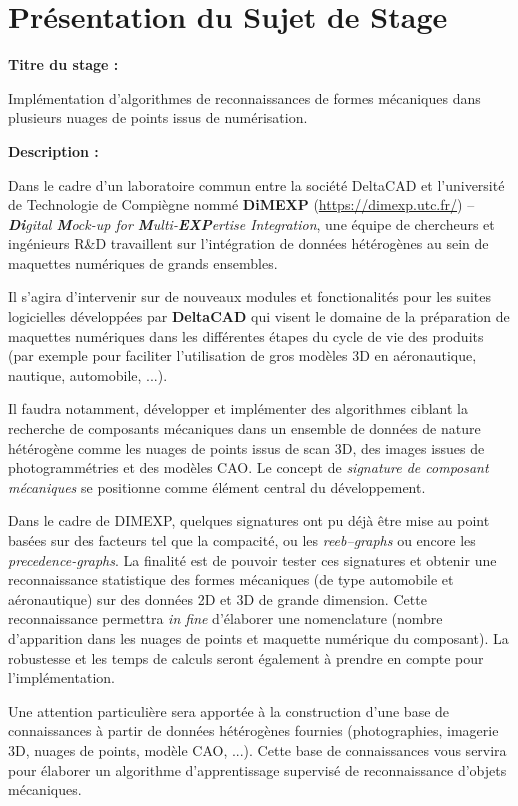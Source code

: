 \chapter{Présentation du Sujet de Stage}

	\textbf{Titre du stage :}
	
	Implémentation d’algorithmes de reconnaissances de formes mécaniques dans plusieurs nuages de points issus de numérisation.
	
	\textbf{Description :}
	
Dans le cadre d’un laboratoire commun entre la société DeltaCAD et l’université de Technologie de Compiègne nommé \textbf{DiMEXP} (\url{https://dimexp.utc.fr/}) – \textit{\textbf{Di}gital \textbf{M}ock-up for \textbf{M}ulti-\textbf{EXP}ertise Integration}, une équipe de chercheurs et ingénieurs R\&D travaillent sur l’intégration de données hétérogènes au sein de maquettes numériques de grands ensembles. 

Il s'agira d'intervenir sur de nouveaux modules et fonctionalités pour les suites logicielles développées par \textbf{DeltaCAD} qui visent le domaine de la préparation de maquettes numériques dans les différentes étapes du cycle de vie des produits (par exemple pour faciliter l’utilisation de gros modèles 3D en aéronautique, nautique, automobile, ...). 

Il faudra notamment, développer et implémenter des algorithmes ciblant la recherche de composants mécaniques dans un ensemble de données de nature hétérogène comme les nuages de points issus de scan 3D, des images issues de photogrammétries et des modèles CAO. Le concept de \textit{signature de composant mécaniques} se positionne comme élément central du développement. 

Dans le cadre de DIMEXP, quelques signatures ont pu déjà être mise au point basées sur des facteurs tel que la compacité, ou les \textit{reeb–graphs} ou encore les \textit{precedence-graphs}. La finalité est de pouvoir tester ces signatures et obtenir une reconnaissance statistique des formes mécaniques (de type automobile et aéronautique) sur des données 2D et 3D de grande dimension. Cette reconnaissance permettra \textit{in fine} d’élaborer une nomenclature (nombre d’apparition dans les nuages de points et maquette numérique du composant). La robustesse et les temps de calculs seront également à prendre en compte pour l’implémentation.

Une attention particulière sera apportée à la construction d'une base de connaissances à partir de données hétérogènes fournies (photographies, imagerie 3D, nuages de points, modèle CAO, ...). Cette base de connaissances vous servira pour élaborer un algorithme d'apprentissage supervisé de reconnaissance d'objets mécaniques.

\clearpage

